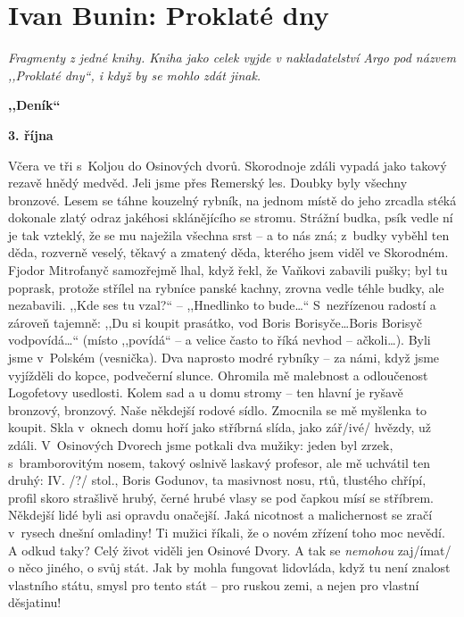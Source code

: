 \section{Ivan Bunin: Proklaté dny}

\noindent
\textit{Fragmenty z jedné knihy. Kniha jako celek vyjde v nakladatelství Argo pod názvem ,,Proklaté dny``, i když by se mohlo zdát jinak.}

\medskip

\noindent
\textbf{,,Deník``}

\medskip

\noindent
\textbf{3. října}

\noindent
Včera ve tři s Koljou do Osinových dvorů. Skorodnoje zdáli vypadá jako takový rezavě hnědý medvěd. Jeli jsme přes Remerský les. Doubky byly všechny bronzové. Lesem se táhne kouzelný rybník, na jednom místě do jeho zrcadla stéká dokonale zlatý odraz jakéhosi sklánějícího se stromu. Strážní budka, psík vedle ní je tak vzteklý, že se mu naježila všechna srst -- a to nás zná; z budky vyběhl ten děda, rozverně veselý, těkavý a zmatený děda, kterého jsem viděl ve Skorodném. Fjodor Mitrofanyč samozřejmě lhal, když řekl, že Vaňkovi zabavili pušky; byl tu poprask, protože střílel na rybníce panské kachny, zrovna vedle téhle budky, ale nezabavili. ,,Kde ses tu vzal?`` -- ,,Hnedlinko to bude\ldots`` S nezřízenou radostí a zároveň tajemně: ,,Du si koupit prasátko, vod Boris Borisyče\ldots Boris Borisyč vodpovídá\ldots`` (místo ,,povídá`` -- a velice často to říká nevhod -- ačkoli\ldots). Byli jsme v Polském (vesnička). Dva naprosto modré rybníky -- za námi, když jsme vyjížděli do kopce, podvečerní slunce. Ohromila mě malebnost a odloučenost Logofetovy usedlosti. Kolem sad a u domu stromy -- ten hlavní je ryšavě bronzový, bronzový. Naše někdejší rodové sídlo. Zmocnila se mě myšlenka to koupit. Skla v oknech domu hoří jako stříbrná slída, jako zář/ivé/ hvězdy, už zdáli. V Osinových Dvorech jsme potkali dva mužiky: jeden byl zrzek, s bramborovitým nosem, takový oslnivě laskavý profesor, ale mě uchvátil ten druhý: IV. /?/ stol., Boris Godunov, ta masivnost nosu, rtů, tlustého chřípí, profil skoro strašlivě hrubý, černé hrubé vlasy se pod čapkou mísí se stříbrem. Někdejší lidé byli asi opravdu onačejší. Jaká nicotnost a malichernost se zračí v rysech dnešní omladiny! Ti mužici říkali, že o novém zřízení toho moc nevědí. A odkud taky? Celý život viděli jen Osinové Dvory. A tak se \textit{nemohou} zaj/ímat/ o něco jiného, o svůj stát. Jak by mohla fungovat lidovláda, když tu není znalost vlastního státu, smysl pro tento stát -- pro ruskou zemi, a nejen pro vlastní děsjatinu!

